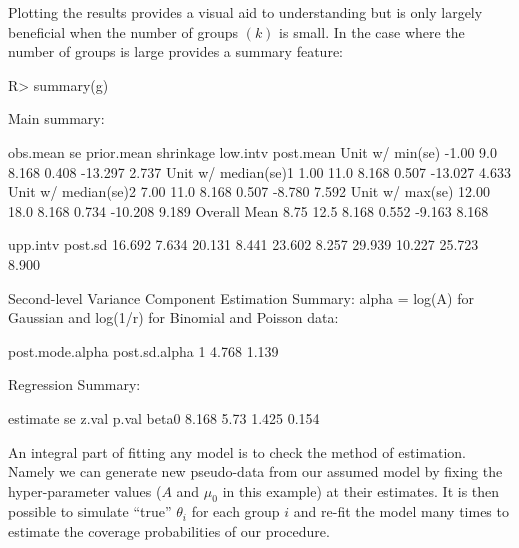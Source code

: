 \documentclass[article]{jss}
\begin{document}
Plotting the results provides a visual aid to understanding but is only largely beneficial when the number of groups $(k)$ is small. In the case where the number of groups is large  provides a summary feature:

\begin{CodeChunk}
\begin{CodeInput}
R> summary(g)
\end{CodeInput}
\begin{CodeOutput}
Main summary:

                    obs.mean   se prior.mean shrinkage low.intv post.mean
Unit w/ min(se)        -1.00  9.0      8.168     0.408  -13.297     2.737
Unit w/ median(se)1     1.00 11.0      8.168     0.507  -13.027     4.633
Unit w/ median(se)2     7.00 11.0      8.168     0.507   -8.780     7.592
Unit w/ max(se)        12.00 18.0      8.168     0.734  -10.208     9.189
Overall Mean            8.75 12.5      8.168     0.552   -9.163     8.168

                     upp.intv post.sd
                       16.692   7.634
                       20.131   8.441
                       23.602   8.257
                       29.939  10.227
                       25.723   8.900

Second-level Variance Component Estimation Summary:
alpha = log(A) for Gaussian and log(1/r) for Binomial and Poisson data:

  post.mode.alpha post.sd.alpha
1           4.768         1.139


Regression Summary:

      estimate   se z.val p.val
beta0    8.168 5.73 1.425 0.154
\end{CodeOutput}
\end{CodeChunk}


An integral part of fitting any model is to check the method of estimation. Namely we can generate new pseudo-data from our assumed model by fixing the hyper-parameter values ($A$ and $\mu_0$ in this example) at their estimates. It is then possible to simulate ``true'' $\theta_i$ for each group $i$ and re-fit the model many times to estimate the coverage probabilities of our procedure.  
\end{document}
